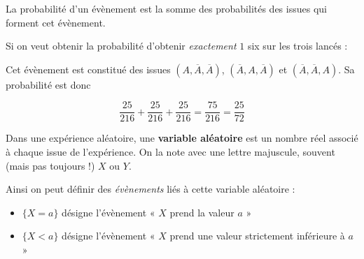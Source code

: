 \documentclass[
	classe=$1^{ere}STI2D$
]{coursclass}
\begin{document}
\begin{propriete}
	La probabilité d'un évènement est la somme des probabilités des issues qui forment cet évènement.
\end{propriete}

\begin{exemple}
	Si on veut obtenir la probabilité d'obtenir \textit{exactement} $1$ six sur les trois lancés :

	Cet évènement est constitué des issues $(A, \overline{A}, \overline{A})$, $(\overline{A}, A, \overline{A})$ et $(\overline{A}, \overline{A}, A)$. Sa probabilité est donc

	\begin{center}

		$$ \dfrac{25}{216} + \dfrac{25}{216} + \dfrac{25}{216} = \dfrac{75}{216} = \dfrac{25}{72} $$
	\end{center}
\end{exemple}

\begin{definition}
	Dans une expérience aléatoire, une \textbf{variable aléatoire} est un nombre réel associé à chaque issue de l'expérience. On la note avec une lettre majuscule, souvent (mais pas toujours !) $X$ ou $Y$.

	Ainsi on peut définir des \textit{évènements} liés à cette variable aléatoire :
	\begin{itemize}
		\item $\{X = a\}$ désigne l'évènement « $X$ prend la valeur $a$ »
		\item $\{X < a\}$ désigne l'évènement « $X$ prend une valeur strictement inférieure à $a$ »
	\end{itemize}
\end{definition}
\end{document}
